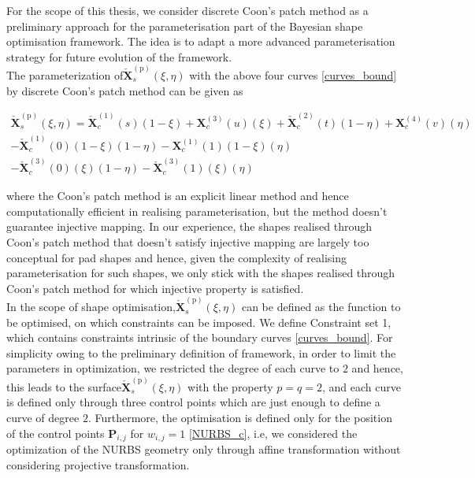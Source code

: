 For the scope of this thesis, we consider discrete Coon's patch method as a preliminary approach for the parameterisation part of the Bayesian shape optimisation framework. The idea is to adapt a more advanced parameterisation strategy for future evolution of the framework.\\



The parameterization of$ \bm {\check{X}}_{s}^{(\mathrm p)}(\xi,\eta)$ with the above four curves \eqref{curves_bound} by discrete Coon's patch method can be given as

\begin{multline}
    \bm {\check{X}}_{s}^{(\mathrm p)}(\xi,\eta) =\bm {\check{X}}_{c}^{(1)}(s)(1-\xi)+\bm X_c^{(3)}(u)(\xi)+\bm {\check{X}}_{c}^{(2)}(t)(1-\eta)+\bm X_c^{(4)}(v)(\eta)\\-\bm {\check{X}}_{c}^{(1)}(0)(1-\xi)(1-\eta) - \bm  X_c^{(1)}(1)(1-\xi)(\eta)\\ -\bm {\check{X}}_{c}^{(3)}(0)(\xi)(1-\eta) -\bm {\check{X}}_{c}^{(3)}(1)(\xi)(\eta)
\end{multline}

where the Coon's patch method is an explicit linear method and hence computationally efficient in realising parameterisation, but the method doesn't guarantee injective mapping. 
In our experience, the shapes realised through Coon's patch method that doesn't satisfy injective mapping are largely too conceptual for pad shapes and hence, given the complexity of realising parameterisation for such shapes, we only stick with the shapes realised through Coon's patch method for which injective property is satisfied.\\

In the scope of shape optimisation,$ \bm {\check{X}}_{s}^{(\mathrm p)}(\xi,\eta)$ can be defined as the function to be optimised, on which constraints can be imposed.
We define Constraint set 1, which contains constraints intrinsic of the boundary curves \eqref{curves_bound}. For simplicity owing to the preliminary definition of framework, in order to limit the parameters in optimization, we restricted the degree of each curve to $2$ and hence, this leads to the surface$ \bm {\check{X}}_{s}^{(\mathrm p)}(\xi,\eta)$ with the property $p=q=2$, and each curve is defined only through three control points which are just enough to define a curve of degree $2$. 
Furthermore, the optimisation is defined only for the position of the control points $\bm{P}_{i,j}$ for $w_{i,j} =1$ \eqref{NURBS_c}, i.e, we considered the optimization of the NURBS geometry only through affine transformation without considering projective transformation.\\
 
